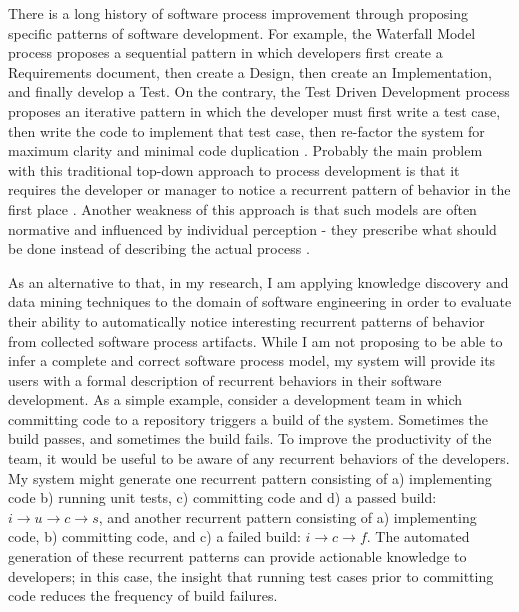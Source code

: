 \documentclass{sig-alternate}
\begin{document}
There is a long history of software process improvement through proposing specific patterns of software development. For example, the Waterfall Model process proposes a sequential pattern in which developers first create a Requirements document, then create a Design, then create an Implementation, and finally develop a Test. On the contrary, the Test Driven Development process proposes an iterative pattern in which the developer must first write a test case, then write the code to implement that test case, then re-factor the system for maximum clarity and minimal code duplication \cite{citeulike:2703162}. Probably the main problem with this traditional top-down approach to process development is that it requires the developer or manager to notice a recurrent pattern of behavior in the first place \cite{citeulike:5043104}. Another weakness of this approach is that such models are often normative and influenced by individual perception - they prescribe what should be done instead of describing the actual process \cite{citeulike:2678511}.

As an alternative to that, in my research, I am applying knowledge discovery and data mining techniques to the domain of software engineering in order to evaluate their ability to automatically notice interesting recurrent patterns of behavior from collected software process artifacts. While I am not proposing to be able to infer a complete and correct software process model, my system will provide its users with a formal description of recurrent behaviors in their software development. As a simple example, consider a development team in which committing code to a repository triggers a build of the system. Sometimes the build passes, and sometimes the build fails. To improve the productivity of the team, it would be useful to be aware of any recurrent behaviors of the developers. My system might generate one recurrent pattern consisting of a) implementing code b) running unit tests, c) committing code and d) a passed build: $i \rightarrow u \rightarrow c \rightarrow s $, and another recurrent pattern consisting of a) implementing code, b) committing code, and c) a failed build: $i \rightarrow c \rightarrow f $. The automated generation of these recurrent patterns can provide actionable knowledge to developers; in this case, the insight that running test cases prior to committing code reduces the frequency of build failures.
\end{document}
